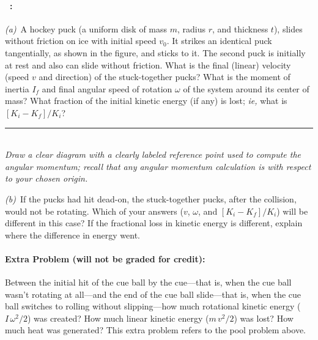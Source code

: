 \documentclass[12pt]{article}
\begin{document}
\paragraph{\problemname~\theproblem:}%
\textsl{(a)}~A hockey puck (a uniform disk of mass $m$, radius $r$,
and thickness $t$), slides without friction on ice with initial speed
$v_0$.  It strikes an identical puck tangentially, as shown in the
figure, and sticks to it.  The second puck is initially at rest and
also can slide without friction.  What is the final (linear) velocity
(speed $v$ and direction) of the stuck-together pucks?  What is the
moment of inertia $I_f$ and final angular speed of rotation $\omega$
of the system around its center of mass?  What fraction of the initial
kinetic energy (if any) is lost; \textit{ie,} what is $[K_i-K_f]/K_i$?
\\ \rule{0.25\textwidth}{0pt}
\\

\emph{Draw a clear diagram with a clearly labeled reference point used
to compute the angular momentum; recall that any angular momentum
calculation is with respect to your chosen origin.}

\textsl{(b)}~If the pucks had hit dead-on, the stuck-together pucks,
after the collision, would not be rotating.  Which of your answers
($v$, $\omega$, and $[K_i-K_f]/K_i$) will be different in this case?
If the fractional loss in kinetic energy is different, explain where
the difference in energy went.

\paragraph{Extra Problem (will not be graded for credit):}%
Between the initial hit of the cue ball by the cue---that is, when the
cue ball wasn't rotating at all---and the end of the cue ball
slide---that is, when the cue ball switches to rolling without
slipping---how much rotational kinetic energy ($I\,\omega^2 / 2$) was
created? How much linear kinetic energy ($m\,v^2 / 2$) was lost? How
much heat was generated? This extra problem refers to the pool problem
above.
\end{document}
